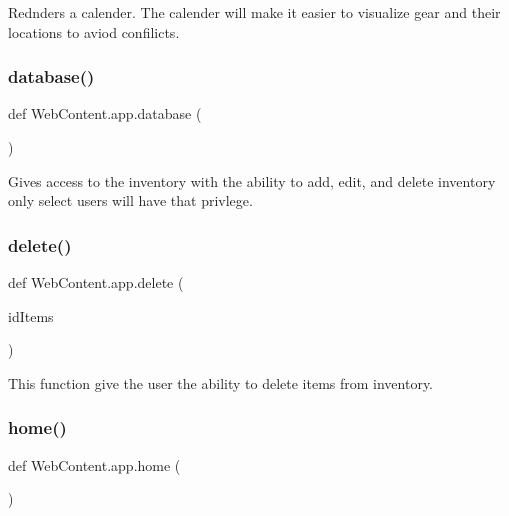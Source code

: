 \begin{DoxyVerb}Rednders a calender.
The calender will make it easier to visualize
gear and their locations to aviod confilicts.
\end{DoxyVerb}
 \mbox{\label{namespace_web_content_1_1app_aeb0d3df489a674be05033bd0ba98e7a6}} 
\subsubsection{\texorpdfstring{database()}{database()}}
{\footnotesize\ttfamily def Web\+Content.\+app.\+database (\begin{DoxyParamCaption}{ }\end{DoxyParamCaption})}

\begin{DoxyVerb}Gives access to the inventory
with the ability to add, edit, and delete
inventory only select users will have that privlege.
\end{DoxyVerb}
 \mbox{\label{namespace_web_content_1_1app_a280b9c530dfd4125df19a186218bb132}} 
\subsubsection{\texorpdfstring{delete()}{delete()}}
{\footnotesize\ttfamily def Web\+Content.\+app.\+delete (\begin{DoxyParamCaption}\item[{}]{id\+Items }\end{DoxyParamCaption})}

\begin{DoxyVerb}This function give the user the
ability to delete items from inventory.
\end{DoxyVerb}
 \mbox{\label{namespace_web_content_1_1app_ab0090e2c92ec892cf11fed49d580737a}} 
\subsubsection{\texorpdfstring{home()}{home()}}
{\footnotesize\ttfamily def Web\+Content.\+app.\+home (\begin{DoxyParamCaption}{ }\end{DoxyParamCaption})}

